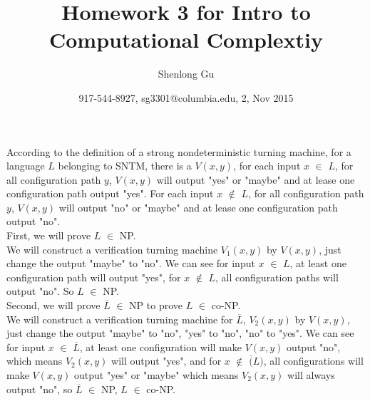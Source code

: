 \documentclass[11pt]{article}
\title{Homework 3 for Intro to Computational Complextiy}
\author{Shenlong Gu}
\date{917-544-8927, sg3301@columbia.edu, 2, Nov 2015}
\begin{document}
\maketitle
\part{}

\def \vf {$V_{1}(x,c)$}
\def \vs {$V_{2}(x,c)$}
\def \v {$V(x,c)$}
\def \mf {$M_{1}$}
\def \ms {$M_{2}$}
\def \lf {$L_{1}$}
\def \ls {$L_{2}$}
    According to the definition of a strong nondeterministic turning machine, for a language $L$ belonging to SNTM, there is a $V(x, y)$, for each input
    $x$ $\in$ $L$, for all configuration path $y$, $V(x, y)$ will output "yes" or "maybe" and at lease one configuration path output "yes". For each input
    $x$ $\notin$ $L$, for all configuration path $y$, $V(x, y)$ will output "no" or "maybe" and at lease one configuration path output "no". \\ 
    First, we will prove $L$ $\in$ NP. \\
    We will construct a verification turning machine $V_{1}(x, y)$ by $V(x, y)$, just change the output "maybe" to "no". We can see for input $x$ $\in$ $L$, 
    at least one configuration path will output "yes", for $x$ $\notin$ $L$, all configuration paths will output "no". So $L$ $\in$ NP. \\ 
    Second, we will prove $\overline{L}$ $\in$ NP to prove $L$ $\in$ co-NP. \\
    We will construct a verification turning machine for $\overline{L}$, $V_{2}(x, y)$ by $V(x, y)$, just change the output "maybe" to "no", "yes" to "no", "no" to "yes". We can see for input $x$ $\in$ $\overline{L}$, at least one configuration will make $V(x,y)$ output "no", which means $V_{2}(x, y)$ will output "yes", and for $x$ $\notin$ $\overline(L)$, all configurations will make $V(x,y)$ output "yes" or "maybe" which means $V_{2}(x, y)$ will always output "no", so $\overline{L}$ $\in$ NP, $L$ $\in$ co-NP.
\end{document}
